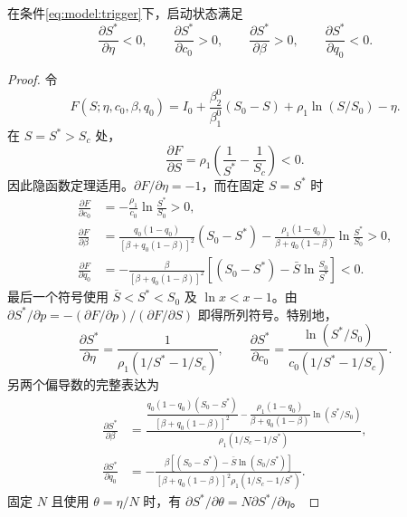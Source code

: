 \documentclass[lang=cn,a4paper,newtx]{elegantpaper}
\numberwithin{equation}{section}
\theoremstyle{plain}
\begin{document}
\begin{lemma}
\label{lem:s1:Sstar-sensitivity}
在条件\eqref{eq:model:trigger}下，启动状态满足
\begin{equation}
\frac{\partial S^*}{\partial\eta}<0,\qquad
\frac{\partial S^*}{\partial c_0}>0,\qquad
\frac{\partial S^*}{\partial\beta}>0,\qquad
\frac{\partial S^*}{\partial q_0}<0.
\label{eq:s1:Sstar-signs}
\end{equation}
\end{lemma}
\begin{proof}
令
\[
F(S;\eta,c_0,\beta,q_0)
=I_0+\frac{\beta_2^0}{\beta_1^0}(S_0-S)+\rho_1\ln(S/S_0)-\eta.
\]
在 $S=S^*>S_c$ 处，
\[
\frac{\partial F}{\partial S}=\rho_1\left(\frac1{S^*}-\frac1{S_c}\right)<0.
\]
因此隐函数定理适用。$\partial F/\partial\eta=-1$，而在固定 $S=S^*$ 时
\begin{align*}
\frac{\partial F}{\partial c_0}
&=-\frac{\rho_1}{c_0}\ln\frac{S^*}{S_0}>0,\\
\frac{\partial F}{\partial\beta}
&=\frac{q_0(1-q_0)}{[\beta+q_0(1-\beta)]^2}(S_0-S^*)
-\frac{\rho_1(1-q_0)}{\beta+q_0(1-\beta)}\ln\frac{S^*}{S_0}>0,\\
\frac{\partial F}{\partial q_0}
&=-\frac{\beta}{[\beta+q_0(1-\beta)]^2}\left[(S_0-S^*)-\bar S\ln\frac{S_0}{S^*}\right]<0.
\end{align*}
最后一个符号使用 $\bar S<S^*<S_0$ 及 $\ln x<x-1$。由
$\partial S^*/\partial p=-(\partial F/\partial p)/(\partial F/\partial S)$ 即得所列符号。特别地，
\begin{equation}
\frac{\partial S^*}{\partial\eta}
=\frac1{\rho_1(1/S^*-1/S_c)},\qquad
\frac{\partial S^*}{\partial c_0}
=\frac{\ln(S^*/S_0)}{c_0(1/S^*-1/S_c)}.
\label{eq:s1:Sstar-eta-sign}
\end{equation}
另两个偏导数的完整表达为
\begin{align}
\frac{\partial S^*}{\partial\beta}
&=\frac{\dfrac{q_0(1-q_0)(S_0-S^*)}{[\beta+q_0(1-\beta)]^2}
-\dfrac{\rho_1(1-q_0)}{\beta+q_0(1-\beta)}\ln(S^*/S_0)}
{\rho_1(1/S_c-1/S^*)},\label{eq:s1:Sstar-beta-sign}\\
\frac{\partial S^*}{\partial q_0}
&=-\frac{\beta[(S_0-S^*)-\bar S\ln(S_0/S^*)]}
{[\beta+q_0(1-\beta)]^2\rho_1(1/S_c-1/S^*)}.
\label{eq:s1:Sstar-q0-sign}
\end{align}
固定 $N$ 且使用 $\theta=\eta/N$ 时，有 $\partial S^*/\partial\theta=N\partial S^*/\partial\eta$。
\end{proof}
\end{document}

